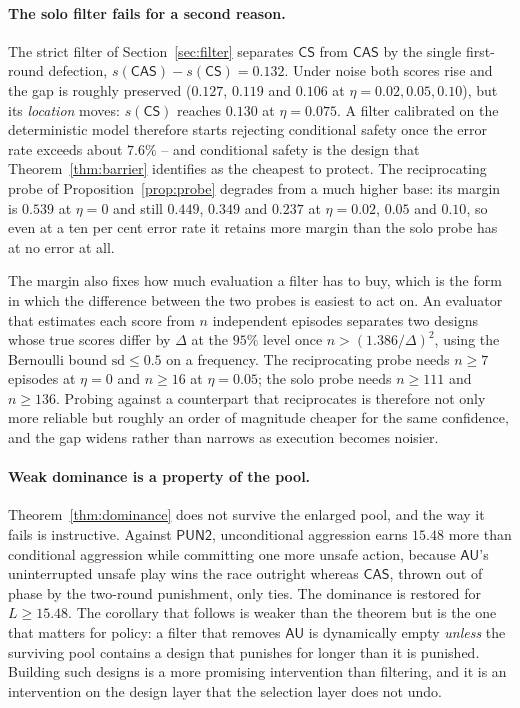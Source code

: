 \documentclass[pdflatex]{sn-jnl}
\theoremstyle{thmstyleone}
\theoremstyle{thmstylethree}
\theoremstyle{thmstyletwo}
\newcommand{\AU}{\textsf{AU}}
\newcommand{\CS}{\textsf{CS}}
\newcommand{\CAS}{\textsf{CAS}}
\begin{document}
\paragraph{The solo filter fails for a second reason.}
The strict filter of Section~\ref{sec:filter} separates $\CS$ from $\CAS$ by
the single first-round defection, $s(\CAS)-s(\CS)=0.132$. Under noise both
scores rise and the gap is roughly preserved ($0.127$, $0.119$ and $0.106$ at
$\eta=0.02,0.05,0.10$), but its \emph{location} moves: $s(\CS)$ reaches
$0.130$ at $\eta=0.075$. A filter calibrated on the deterministic model
therefore starts rejecting conditional safety once the error rate exceeds
about $7.6\%$ -- and conditional safety is the design that
Theorem~\ref{thm:barrier} identifies as the cheapest to protect. The
reciprocating probe of
Proposition~\ref{prop:probe} degrades from a much higher base: its margin is
$0.539$ at $\eta=0$ and still $0.449$, $0.349$ and $0.237$ at $\eta=0.02$,
$0.05$ and $0.10$, so even at a ten per cent error rate it retains more margin
than the solo probe has at no error at all.

The margin also fixes how much evaluation a filter has to buy, which is the
form in which the difference between the two probes is easiest to act on. An
evaluator that estimates each score from $n$ independent episodes separates
two designs whose true scores differ by $\Delta$ at the $95\%$ level once
$n>(1.386/\Delta)^{2}$, using the Bernoulli bound $\mathrm{sd}\le0.5$ on a
frequency. The reciprocating probe needs $n\ge7$ episodes at $\eta=0$ and
$n\ge16$ at $\eta=0.05$; the solo probe needs $n\ge111$ and $n\ge136$. Probing
against a counterpart that reciprocates is therefore not only more reliable
but roughly an order of magnitude cheaper for the same confidence, and the
gap widens rather than narrows as execution becomes noisier.

\paragraph{Weak dominance is a property of the pool.}
Theorem~\ref{thm:dominance} does not survive the enlarged pool, and the way it
fails is instructive. Against $\mathsf{PUN2}$, unconditional aggression earns
$15.48$ more than conditional aggression while committing one more unsafe
action, because $\AU$'s uninterrupted unsafe play wins the race outright
whereas $\CAS$, thrown out of phase by the two-round punishment, only ties.
The dominance is restored for $L\ge 15.48$. The corollary that follows is
weaker than the theorem but is the one that matters for policy: a filter that
removes $\AU$ is dynamically empty \emph{unless} the surviving pool contains a
design that punishes for longer than it is punished. Building such designs is
a more promising intervention than filtering, and it is an intervention on the
design layer that the selection layer does not undo.
\end{document}
